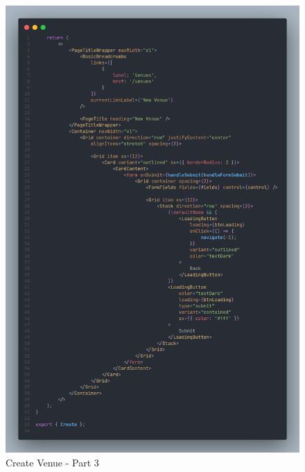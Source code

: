 \begin{justify}
\begin{itemize}
                \begin{figure}[H]
                    \centerline{\includegraphics[width=150mm,scale=1]{figures/implementation_and_testing/implementation/frontend/create_venue-3.png}}
                    \caption{Create Venue - Part 3}
                \end{figure}
            

\end{itemize}
\end{justify}
